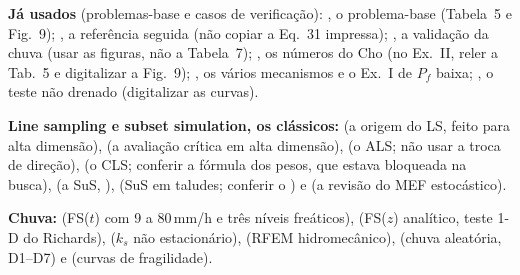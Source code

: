 \documentclass[11pt,a4paper]{article}
\begin{document}
\textbf{Já usados} (problemas-base e casos de verificação):  \citep{cho2010}, o problema-base
(Tabela~5 e Fig.~9);  \citep{vargasceron2025}, a referência seguida (não copiar a Eq.~31
impressa);  \citep{rahardjo2007}, a validação da chuva (usar as figuras, não a Tabela~7);
 \citep{li2015}, os números do Cho (no Ex.~II, reler a Tab.~5 e digitalizar a Fig.~9);
 \citep{jiang2015}, os vários mecanismos e o Ex.~I de $P_f$ baixa; 
\citep{griffiths2004}, o teste não drenado (digitalizar as curvas).

\textbf{Line sampling e subset simulation, os clássicos:}  (a origem do LS, feito para
alta dimensão),  (a avaliação crítica em alta dimensão),  (o ALS; não
usar a troca de direção),  (o CLS; conferir a fórmula dos pesos, que estava bloqueada na
busca),  (a SuS, \citealp{au2001}),  (SuS em taludes; conferir o ) e
 (a revisão do MEF estocástico).

\textbf{Chuva:}  (FS($t$) com 9 a 80\,mm/h e três níveis freáticos),  (FS($z$)
analítico, teste 1-D do Richards),  ($k_s$ não estacionário),  (RFEM
hidromecânico),  (chuva aleatória, D1--D7) e  (curvas de fragilidade).
\end{document}
